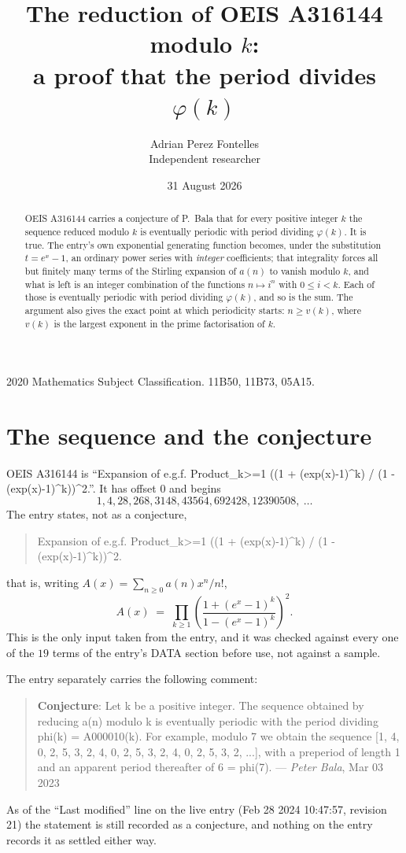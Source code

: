 \documentclass[11pt,a4paper]{article}
\title{The reduction of OEIS A316144 modulo $k$:\\ a proof that the period divides
$\varphi(k)$}
\author{Adrian Perez Fontelles\\ \small Independent researcher}
\date{31 August 2026}
\theoremstyle{plain}
\theoremstyle{definition}
\begin{document}
\maketitle

\begin{abstract}
OEIS A316144 carries a conjecture of P.~Bala that for every positive integer $k$ the
sequence reduced modulo $k$ is eventually periodic with period dividing $\varphi(k)$.
It is true. The entry's own exponential generating function becomes, under the
substitution $t=e^{x}-1$, an ordinary power series with \emph{integer} coefficients;
that integrality forces all but finitely many terms of the Stirling expansion of $a(n)$
to vanish modulo $k$, and what is left is an integer combination of the functions
$n\mapsto i^{n}$ with $0\le i<k$. Each of those is eventually periodic with period
dividing $\varphi(k)$, and so is the sum. The argument also gives the exact point at
which periodicity starts: $n\ge v(k)$, where $v(k)$ is the largest exponent in the
prime factorisation of $k$.
\end{abstract}

\noindent\small 2020 Mathematics Subject Classification. 11B50, 11B73, 05A15.\normalsize

\section{The sequence and the conjecture}

OEIS A316144 is ``Expansion of e.g.f. Product\_{k>=1} ((1 + (exp(x)-1)\^{}k) / (1 - (exp(x)-1)\^{}k))\^{}2.''. It has offset $0$ and begins
\[
1, 4, 28, 268, 3148, 43564, 692428, 12390508,\ \dots
\]
The entry states, not as a conjecture,
\begin{quote}\small
Expansion of e.g.f. Product\_{k>=1} ((1 + (exp(x)-1)\^{}k) / (1 - (exp(x)-1)\^{}k))\^{}2.
\end{quote}
that is, writing $A(x)=\sum_{n\ge 0}a(n)x^{n}/n!$,
\begin{equation}\label{eq:egf}
A(x)\;=\;\prod_{k\ge 1}\left(\frac{1+(e^{x}-1)^{k}}{1-(e^{x}-1)^{k}}\right)^{2}.
\end{equation}
This is the only input taken from the entry, and it was checked against every one of the
$19$ terms of the entry's DATA section before use, not against a sample.

The entry separately carries the following comment:
\begin{quote}\small
\textbf{Conjecture}: Let k be a positive integer. The sequence obtained by reducing a(n) modulo k is eventually periodic with the period dividing phi(k) = A000010(k). For example, modulo 7 we obtain the sequence [1, 4, 0, 2, 5, 3, 2, 4, 0, 2, 5, 3, 2, 4, 0, 2, 5, 3, 2, ...], with a preperiod of length 1 and an apparent period thereafter of 6 = phi(7). --- \emph{Peter Bala}, Mar 03 2023
\end{quote}
As of the ``Last modified'' line on the live entry (Feb 28 2024 10:47:57, revision
21) the statement is still recorded as a conjecture, and nothing on the entry
records it as settled either way.
\end{document}
